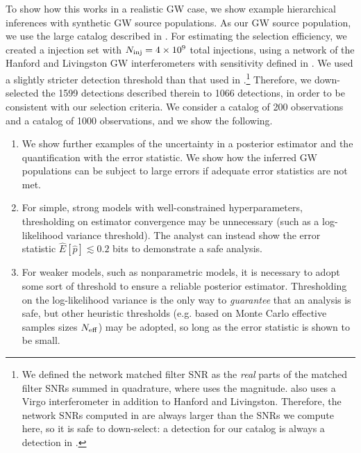 \documentclass[%
 reprint,
 amsmath,amssymb,
 aps,nofootinbib,nobibnotes,onecolumn,prd
]{revtex4-2}
\begin{document}
To show how this works in a realistic \ac{GW} case, we show example hierarchical inferences with synthetic \ac{GW} source populations. 
As our \ac{GW} source population, we use the large catalog described in \citet{Vitale:2025lms}. For estimating the selection efficiency, we created a injection set with $N_{\rm inj} = 4\times 10^9$ total injections, using a network of the Hanford and Livingston \ac{GW} interferometers with sensitivity defined in \citet{O4_psds}. We used a slightly stricter detection threshold than that used in \citet{Vitale:2025lms}.\footnote{We defined the network matched filter SNR as the \textit{real} parts of the matched filter SNRs summed in quadrature, where \citet{Vitale:2025lms} uses the magnitude. \citet{Vitale:2025lms} also uses a Virgo interferometer in addition to Hanford and Livingston. Therefore, the network SNRs computed in \citet{Vitale:2025lms} are always larger than the SNRs we compute here, so it is safe to down-select: a detection for our catalog is always a detection in \citet{Vitale:2025lms}.} Therefore, we down-selected the 1599 detections described therein to 1066 detections, in order to be consistent with our selection criteria. We consider a catalog of 200 observations and a catalog of 1000 observations, and we show the following.

\begin{enumerate}
    \item We show further examples of the uncertainty in a posterior estimator and the quantification with the error statistic. We show how the inferred \ac{GW} populations can be subject to large errors if adequate error statistics are not met.
    \item For simple, strong models with well-constrained hyperparameters, thresholding on estimator convergence may be unnecessary (such as a log-likelihood variance threshold). The analyst can instead show the error statistic $\hat{E}[\hat{p}] \lesssim 0.2$ bits to demonstrate a safe analysis. 
    \item For weaker models, such as nonparametric models, it is necessary to adopt some sort of threshold to ensure a reliable posterior estimator. Thresholding on the log-likelihood variance is the only way to \textit{guarantee} that an analysis is safe, but other heuristic thresholds (e.g. based on Monte Carlo effective samples sizes $N_{\rm eff}$) may be adopted, so long as the error statistic is shown to be small.
\end{enumerate}
\end{document}
